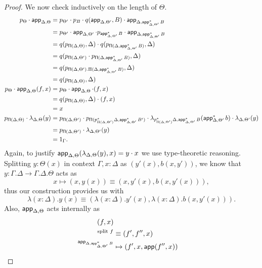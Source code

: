 \begin{proof}
  \noindent
  We now check inductively on the length of $\Theta$.
  \begin{align*}
    p_{\Theta}\cdot\operatorname{\mathsf{app}}_{\Delta,\Theta}
    &=p_{\Theta'}\cdot
    p_B\cdot
    q(\operatorname{\mathsf{app}}_{\Delta,\Theta'},B)\cdot
    \operatorname{\mathsf{app}}_{\Delta,\operatorname{\mathsf{app}}^*_{\Delta,\Theta'}B} \\
    &=p_{\Theta'}\cdot
    \operatorname{\mathsf{app}}_{\Delta,\Theta'}\cdot
    p_{\operatorname{\mathsf{app}}^*_{\Delta,\Theta'}B}\cdot
    \operatorname{\mathsf{app}}_{\Delta,\operatorname{\mathsf{app}}^*_{\Delta,\Theta'}B} \\
    &=q(p_{\operatorname{\mathsf{\Pi}}(\Delta,\Theta)},\Delta)\cdot
    q(p_{\operatorname{\mathsf{\Pi}}(\Delta,\operatorname{\mathsf{app}}^*_{\Delta,\Theta'}B)},\Delta) \\
    &=q(p_{\operatorname{\mathsf{\Pi}}(\Delta,\Theta')}\cdot
    p_{\operatorname{\mathsf{\Pi}}(\Delta,\operatorname{\mathsf{app}}^*_{\Delta,\Theta'}B)},\Delta) \\
    &=q(p_{\operatorname{\mathsf{\Pi}}(\Delta,\Theta').\Pi(\Delta,\operatorname{\mathsf{app}}^*_{\Delta,\Theta'}B)},\Delta) \\
    &=q(p_{\operatorname{\mathsf{\Pi}}(\Delta,\Theta)},\Delta) \\
    p_\Theta\cdot\operatorname{\mathsf{app}}_{\Delta,\Theta}(f,x)
    &=p_\Theta\cdot\operatorname{\mathsf{app}}_{\Delta,\Theta}\cdot(f,x) \\
    &=q(p_{\operatorname{\mathsf{\Pi}}(\Delta,\Theta)},\Delta)\cdot(f,x) \\
    &=x \\
    p_{\operatorname{\mathsf{\Pi}}(\Delta,\Theta)}\cdot
    \lambda_{\Delta,\Theta}(y)
    &=p_{\operatorname{\mathsf{\Pi}}(\Delta,\Theta')}\cdot
    p_{\operatorname{\mathsf{\Pi}}(p_{\Pi(\Delta,\Theta')}^*\Delta,\operatorname{\mathsf{app}}^*_{\Delta,\Theta'}B')}\cdot
    \lambda_{p^*_{\operatorname{\mathsf{\Pi}}(\Delta,\Theta')}\Delta,\operatorname{\mathsf{app}}^*_{\Delta,\Theta'}B}(\operatorname{\mathsf{app}}_{\Delta,\Theta'}^*b)\cdot
    \lambda_{\Delta,\Theta'}(y) \\
    &=p_{\operatorname{\mathsf{\Pi}}(\Delta,\Theta')}\cdot
    \lambda_{\Delta,\Theta'}(y) \\
    &=1_\Gamma.
  \end{align*}
  Again, to justify
  $\operatorname{\mathsf{app}}_{\Delta,\Theta}(\lambda_{\Delta,\Theta}(y),x)=y\cdot x$ we use
  type-theoretic reasoning.
  Splitting $y:\Theta(x)$ in context $\Gamma,x:\Delta$ as $(y'(x),b(x,y'))$, we
  know that $y\colon\Gamma.\Delta\rightarrow\Gamma.\Delta.\Theta$ acts as
  \[x\mapsto(x,y(x))\equiv(x,y'(x),b(x,y'(x))),\]
  thus our construction provides us with
  \[\lambda(x:\Delta).y(x)\equiv
  (\lambda(x:\Delta).y'(x),\lambda(x:\Delta).b(x,y'(x))).\]
  Also, $\operatorname{\mathsf{app}}_{\Delta,\Theta}$ acts internally as
  \begin{align*}
    (f,x) \\
    ^{\text{split }f}&\equiv(f',f'',x) \\
    ^{\app_{\Delta,\app^*_{\Delta,\Theta'}B}}&\mapsto(f',x,\app(f'',x)) \\

\end{align*}
\end{proof}
